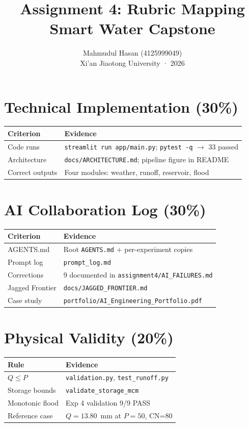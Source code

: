 \documentclass[11pt,a4paper]{article}
\title{Assignment 4: Rubric Mapping\\Smart Water Capstone}
\author{Mahmudul Hasan (4125999049)\\Xi'an Jiaotong University · 2026}
\date{}
\begin{document}
\maketitle

\section{Technical Implementation (30\%)}
\begin{tabular}{@{}p{4cm}p{9cm}@{}}
\toprule
Criterion & Evidence \\
\midrule
Code runs & \texttt{streamlit run app/main.py}; \texttt{pytest -q} $\rightarrow$ 33 passed \\
Architecture & \texttt{docs/ARCHITECTURE.md}; pipeline figure in README \\
Correct outputs & Four modules: weather, runoff, reservoir, flood \\
\bottomrule
\end{tabular}

\section{AI Collaboration Log (30\%)}
\begin{tabular}{@{}p{4cm}p{9cm}@{}}
\toprule
Criterion & Evidence \\
\midrule
AGENTS.md & Root \texttt{AGENTS.md} + per-experiment copies \\
Prompt log & \texttt{prompt\_log.md} \\
Corrections & 9 documented in \texttt{assignment4/AI\_FAILURES.md} \\
Jagged Frontier & \texttt{docs/JAGGED\_FRONTIER.md} \\
Case study & \texttt{portfolio/AI\_Engineering\_Portfolio.pdf} \\
\bottomrule
\end{tabular}

\section{Physical Validity (20\%)}
\begin{tabular}{@{}p{4cm}p{9cm}@{}}
\toprule
Rule & Evidence \\
\midrule
$Q \le P$ & \texttt{validation.py}, \texttt{test\_runoff.py} \\
Storage bounds & \texttt{validate\_storage\_mcm} \\
Monotonic flood & Exp 4 validation 9/9 PASS \\
Reference case & $Q=13.80$~mm at $P=50$, CN=80 \\
\bottomrule
\end{tabular}
\end{document}
